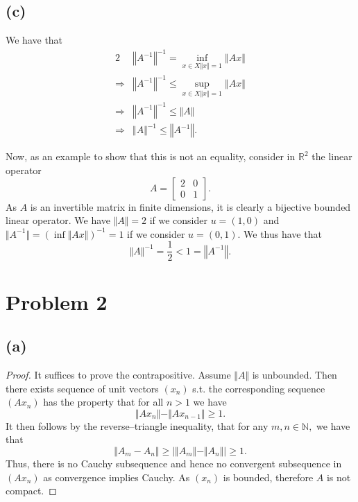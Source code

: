 \documentclass[10pt]{article}
\begin{document}
\subsection*{(c)}

We have that
\begin{alignat*}{2}
    & \left \Vert A^{-1} \right\Vert^{-1} = \inf_{x\in X \Vert x\Vert = 1}\left\Vert Ax\right\Vert\\
    \Rightarrow& \left \Vert A^{-1} \right\Vert^{-1} \le \sup_{x\in X \Vert x\Vert = 1}\left\Vert Ax\right\Vert\\
    \Rightarrow& \left\Vert A^{-1} \right\Vert^{-1} \le \Vert A\Vert\\
    \Rightarrow&\Vert A\Vert^{-1} \le \left\Vert A^{-1} \right\Vert.
\end{alignat*}

Now, as an example to show that this is not an equality, consider in $\mathbb{R}^2$ the linear operator
\[A = \begin{bmatrix}
    2 & 0\\
    0 & 1
\end{bmatrix}.\]
As $A$ is an invertible matrix in finite dimensions, it is clearly a bijective bounded linear operator. We have $\Vert A\Vert = 2$ if we consider $u = (1,0)$ and $\Vert A^{-1}\Vert = (\inf \Vert Ax\Vert)^{-1}= 1$ if we consider $u = (0,1).$ We thus have that
\[\Vert A\Vert^{-1} = \frac{1}{2}< 1 = \left \Vert A^{-1}\right\Vert.\]

\section*{Problem 2}

\subsection*{(a)}

\begin{proof}
    It suffices to prove the contrapositive. Assume $\Vert A \Vert$ is unbounded. Then there exists sequence of unit vectors $(x_n)$ s.t. the corresponding sequence $(Ax_n)$ has the property that for all $n > 1$ we have
    \[\Vert Ax_n\Vert - \Vert Ax_{n-1}\Vert \ge 1.\]
    It then follows by the reverse--triangle inequality, that for any $m,n\in\mathbb{N},$ we have that
    \[\Vert A_m - A_n \Vert \ge | \Vert A_m\Vert - \Vert A_n\Vert | \ge 1.\]
    Thus, there is no Cauchy subsequence and hence no convergent subsequence in $(Ax_n)$ as convergence implies Cauchy. As $(x_n)$ is bounded, therefore $A$ is not compact.
\end{proof}
\end{document}
